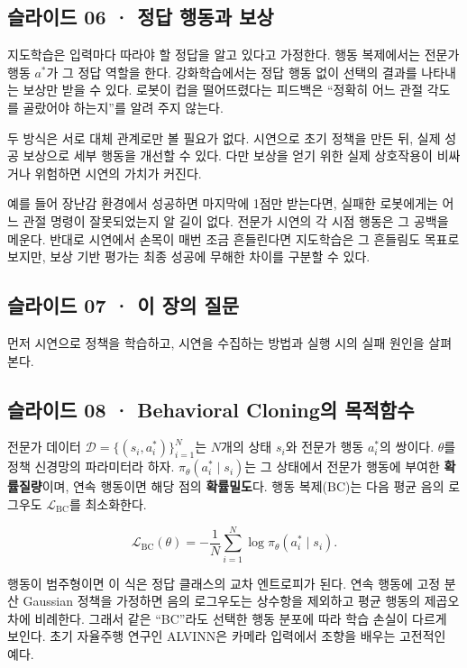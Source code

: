 \documentclass[11pt,a4paper]{article}
\begin{document}
\subsection{슬라이드 06 · 정답 행동과 보상}

지도학습은 입력마다 따라야 할 정답을 알고 있다고 가정한다. 행동 복제에서는 전문가 행동 $a^*$가 그 정답 역할을 한다. 강화학습에서는 정답 행동 없이 선택의 결과를 나타내는 보상만 받을 수 있다. 로봇이 컵을 떨어뜨렸다는 피드백은 “정확히 어느 관절 각도를 골랐어야 하는지”를 알려 주지 않는다.\par

두 방식은 서로 대체 관계로만 볼 필요가 없다. 시연으로 초기 정책을 만든 뒤, 실제 성공 보상으로 세부 행동을 개선할 수 있다. 다만 보상을 얻기 위한 실제 상호작용이 비싸거나 위험하면 시연의 가치가 커진다.\par

예를 들어 장난감 환경에서 성공하면 마지막에 1점만 받는다면, 실패한 로봇에게는 어느 관절 명령이 잘못되었는지 알 길이 없다. 전문가 시연의 각 시점 행동은 그 공백을 메운다. 반대로 시연에서 손목이 매번 조금 흔들린다면 지도학습은 그 흔들림도 목표로 보지만, 보상 기반 평가는 최종 성공에 무해한 차이를 구분할 수 있다.\par

\subsection{슬라이드 07 · 이 장의 질문}

먼저 시연으로 정책을 학습하고, 시연을 수집하는 방법과 실행 시의 실패 원인을 살펴본다.\par

\subsection{슬라이드 08 · Behavioral Cloning의 목적함수}

전문가 데이터 $\mathcal D=\{(s_i,a_i^*)\}_{i=1}^{N}$는 $N$개의 상태 $s_i$와 전문가 행동 $a_i^*$의 쌍이다. $\theta$를 정책 신경망의 파라미터라 하자. $\pi_\theta(a_i^*\mid s_i)$는 그 상태에서 전문가 행동에 부여한 \textbf{확률질량}이며, 연속 행동이면 해당 점의 \textbf{확률밀도}다. 행동 복제(BC)는 다음 평균 음의 로그우도 $\mathcal L_{\mathrm{BC}}$를 최소화한다.\par

\[
\mathcal L_{\mathrm{BC}}(\theta)
=-\frac1N\sum_{i=1}^{N}\log\pi_\theta(a_i^*\mid s_i).
\]

행동이 범주형이면 이 식은 정답 클래스의 교차 엔트로피가 된다. 연속 행동에 고정 분산 Gaussian 정책을 가정하면 음의 로그우도는 상수항을 제외하고 평균 행동의 제곱오차에 비례한다. 그래서 같은 “BC”라도 선택한 행동 분포에 따라 학습 손실이 다르게 보인다. 초기 자율주행 연구인 ALVINN은 카메라 입력에서 조향을 배우는 고전적인 예다.\par
\end{document}
